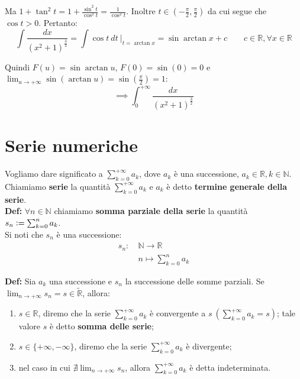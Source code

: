 \documentclass{article}
\begin{document}
Ma $1 + \tan^2 t = 1 + \frac{\sin^2 t}{\cos^2 t} = \frac{1}{\cos^2 t}$. Inoltre $t \in (-\frac{\pi}{2}, \frac{\pi}{2})$ da cui segue che $\cos t > 0$. Pertanto:
\begin{equation*}
    \int \frac{dx}{(x^2 + 1)^\frac{3}{2}} = \int \cos t \ dt \ \bigg|_{t = \arctan x} = \sin\arctan x + c \qquad c \in \mathbb{R}, \forall x \in \mathbb{R}
\end{equation*}

\noindent Quindi $F(u) = \sin\arctan u$, $F(0) = \sin(0) = 0$ e $\lim_{u \to +\infty} \sin(\arctan u) = \sin(\frac{\pi}{2}) = 1$:
\begin{equation*}
    \implies \int_0^{+\infty} \frac{dx}{(x^2 + 1)^\frac{3}{2}}
\end{equation*}

\newpage
\part{Serie numeriche}
Vogliamo dare significato a $\sum_{k = 0}^{+\infty} a_k$, dove $a_k$ è una successione, $a_k \in \mathbb{R}, k \in \mathbb{N}$. Chiamiamo \textbf{serie} la quantità $\sum_{k = 0}^{+\infty} a_k$ e $a_k$ è detto \textbf{termine generale della serie}. \\

\noindent\textbf{Def:} $\forall n \in \mathbb{N}$ chiamiamo \textbf{somma parziale della serie} la quantità $s_n \vcentcolon = \sum_{k = 0}^n a_k$.\\
Si noti che $s_n$ è una successione:
\begin{align*}
    s_n: \ & \mathbb{N} \xrightarrow{} \mathbb{R} \\
    & n \longmapsto \sum_{k = 0}^n a_k
\end{align*}

\noindent\textbf{Def:} Sia $a_k$ una successione e $s_n$ la successione delle somme parziali. Se $\lim_{n \to +\infty} s_n = s \in \widetilde{\mathbb{R}}$, allora:
\begin{enumerate}
    \item $s \in \mathbb{R}$, diremo che la serie $\sum_{k = 0}^{+ \infty} a_k$ è convergente a $s \ (\sum_{k = 0}^{+\infty} a_k = s)$; tale valore $s$ è detto \textbf{somma delle serie};
    \item $s \in \{+\infty, -\infty\}$, diremo che la serie $\sum_{k = 0}^{+\infty} a_k$ è divergente;
    \item nel caso in cui $\nexists \lim_{n \to +\infty} s_n$, allora $\sum_{k = 0}^{+\infty} a_k$ è detta indeterminata.
\end{enumerate}
\end{document}
